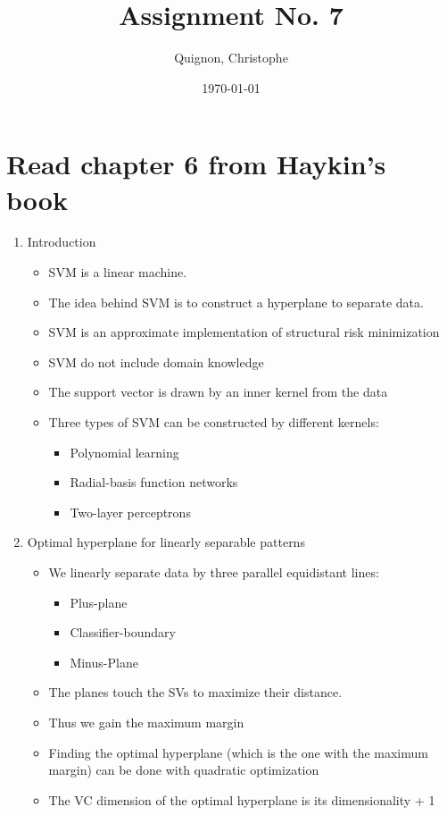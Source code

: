 \documentclass{scrartcl}
\begin{document}
\title{Assignment No. 7}
\subtitle{}
\author{
  Quignon, Christophe \\
} 
\date{\today}


\maketitle

\section{Read chapter 6 from Haykin’s book}
\begin{enumerate}
\item Introduction
	\begin{itemize}
	\item SVM is a linear machine.
	\item The idea behind SVM is to construct a hyperplane to separate data.
	\item SVM is an approximate implementation of structural risk minimization
	\item SVM do not include domain knowledge
	\item The support vector is drawn by an inner kernel from the data
	\item Three types of SVM can be constructed by different kernels:
		\begin{itemize}
		\item Polynomial learning
		\item Radial-basis function networks
		\item Two-layer perceptrons
		\end{itemize}
	\end{itemize}

\item Optimal hyperplane for linearly separable patterns
	\begin{itemize}
	\item We linearly separate data by three parallel equidistant lines:
		\begin{itemize}	
		\item Plus-plane
		\item Classifier-boundary
		\item Minus-Plane
		\end{itemize}
		\item The planes touch the SVs to maximize their distance.
		\item Thus we gain the maximum margin
		\item Finding the optimal hyperplane (which is the one with the maximum margin) can be done with quadratic optimization
		\item The VC dimension of the optimal hyperplane is its dimensionality + 1	\end{itemize}


\end{enumerate}
\end{document}
